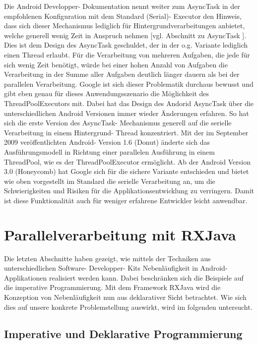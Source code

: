 \documentclass[12pt,oneside,a4paper,bibtotoc,liststotoc]{scrreprt}
\begin{document}
Die Android Developper- Dokumentation nennt weiter zum AsyncTask in der empfohlenen Konfiguration mit dem Standard (Serial)- Executor den Hinweis, dass sich dieser Mechanismus lediglich für Hintergrundverarbeitungen anbietet, welche generell wenig Zeit in Anspruch nehmen  [vgl. Abschnitt zu AsyncTask \citet{androidDevDocu}]. Dies ist dem Design des AsyncTask geschuldet, der in der o.g. Variante lediglich einen Thread erlaubt. Für die Verarbeitung von mehreren Aufgaben, die jede für sich wenig Zeit benötigt, würde bei einer hohen Anzahl von Aufgaben die Verarbeitung in der Summe aller Aufgaben deutlich länger dauern als bei der parallelen Verarbeitung. Google ist sich dieser Problematik durchaus bewusst und gibt eben genau für dieses Anwendungsszenario die Möglichkeit des ThreadPoolExecutors mit. Dabei hat das Design des Andorid AsyncTask über die unterschiedlichen Android Versionen immer wieder Änderungen erfahren. So hat sich die erste Version des AsyncTask- Mechanismus generell auf die serielle Verarbeitung in einem Hintergrund- Thread konzentriert. Mit der im September 2009 veröffentlichten Android- Version 1.6 (Donut) änderte sich das Ausführungsmodell in Richtung einer parallelen Ausführung in einem ThreadPool, wie es der ThreadPoolExecutor ermöglicht. Ab der Android Version 3.0 (Honeycomb) hat Google sich für die sichere Variante entschieden und bietet wie oben vorgestellt im Standard die serielle Verarbeitung an, um die Schwierigkeiten und Risiken für die Applikationsentwicklung zu verringern. Damit ist diese Funktionalität auch für weniger erfahrene Entwickler leicht anwendbar.


\section{Parallelverarbeitung mit RXJava}
Die letzten Abschnitte haben gezeigt, wie mittels der Techniken aus unterschiedlichen Software- Developper- Kits Nebenläufigkeit in Android- Applikationen realisiert werden kann. Dabei beschränken sich die Beispiele auf die imperative Programmierung. Mit dem Framework RXJava wird die Konzeption von Nebenläufigkeit nun aus deklarativer Sicht betrachtet. Wie sich dies auf unsere konkrete Problemstellung auswirkt, wird im folgenden untersucht.
\subsection{Imperative und Deklarative Programmierung}
\end{document}
